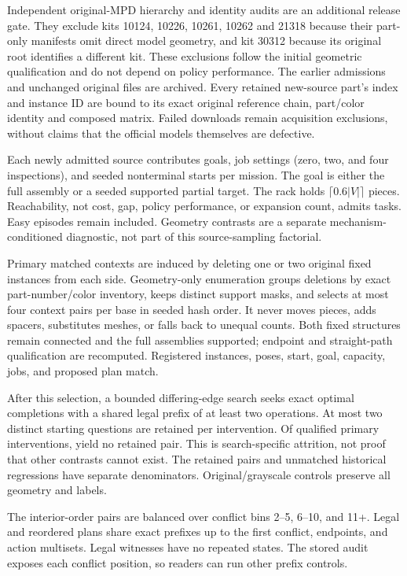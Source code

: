 Independent original-MPD hierarchy and identity audits are an additional
release gate. They exclude kits 10124, 10226, 10261, 10262 and 21318 because
their part-only manifests omit direct model geometry, and kit 30312 because
its original root identifies a different kit. These exclusions follow the
initial geometric qualification and do not depend on policy performance.
The earlier admissions and unchanged original files are archived.
Every retained new-source part's index and instance ID are bound to its exact
original reference chain, part/color identity and composed matrix.
Failed downloads remain acquisition exclusions, without claims that the
official models themselves are defective.

Each newly admitted source contributes \GoalsPerSource{} goals,
\JobSettingsPerSource{} job settings (zero, two, and four inspections),
and \StartsPerMission{} seeded nonterminal starts per mission.
The goal is either the full assembly or a seeded supported partial target.
The rack holds $\lceil0.6|V|\rceil$ pieces. Reachability, not cost, gap,
policy performance, or expansion count, admits tasks. Easy episodes
remain included. Geometry contrasts are a separate mechanism-conditioned
diagnostic, not part of this source-sampling factorial.

Primary matched contexts are induced by deleting one or two original fixed
instances from each side. Geometry-only enumeration groups deletions by
exact part-number/color inventory, keeps distinct support masks, and selects
at most four context pairs per base in seeded hash order. It never moves
pieces, adds spacers, substitutes meshes, or falls back to unequal counts.
Both fixed structures remain connected and the full assemblies supported;
endpoint and straight-path qualification are recomputed. Registered
instances, poses, start, goal, capacity, jobs, and proposed plan match.

After this selection, a bounded differing-edge search seeks exact optimal
completions with a shared legal prefix of at least two operations.
At most two distinct starting questions are retained per intervention.
Of \QualifiedInterventionCount{} qualified primary interventions,
\ZeroYieldInterventionCount{} yield no retained pair. This is search-specific
attrition, not proof that other contrasts cannot exist. The retained
\PrimaryPairCount{} pairs and \HistoricalPairCount{} unmatched historical
regressions have separate denominators. Original/grayscale controls preserve
all geometry and labels.

The \SequencePairCount{} interior-order pairs are balanced over conflict bins 2--5,
6--10, and 11+. Legal and reordered plans share exact prefixes up to
the first conflict, endpoints, and action multisets. Legal witnesses
have no repeated states. The stored audit exposes each conflict position,
so readers can run other prefix controls.

